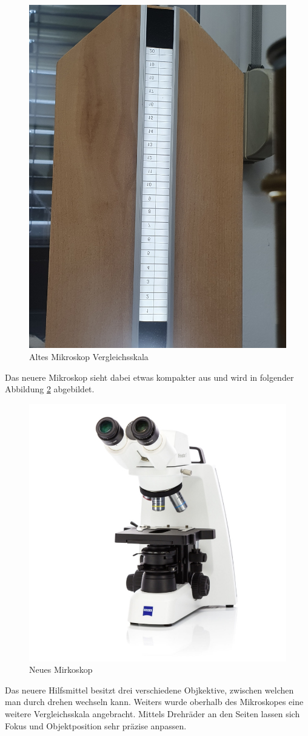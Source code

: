 \documentclass[12pt,a4paper,twoside]{article}
\begin{document}
    \begin{figure}[H]
        \centering
        \includegraphics[width=0.5\linewidth, angle=-90]{nudes/AltesMikroMessskala.jpg}
        \caption{Altes Mikroskop Vergleichsskala}
        \label{fig:Altes Mikroskop Skala}
    \end{figure}

    \noindent
    Das neuere Mikroskop sieht dabei etwas kompakter aus und wird in folgender Abbildung \ref{fig:Neues Mirkoskop} abgebildet.

    \begin{figure}[H]
        \centering
        \includegraphics[width=0.5\linewidth, angle=0]{nudes/neues_mikroskop.jpg}
        \caption{Neues Mirkoskop \cite{neues_mikr}}
        \label{fig:Neues Mirkoskop}
    \end{figure}

    \noindent
    Das neuere Hilfsmittel besitzt drei verschiedene Objkektive, zwischen welchen man durch drehen wechseln kann. Weiters wurde oberhalb des Mikroskopes eine weitere Vergleichsskala angebracht.
    Mittels Drehräder an den Seiten lassen sich Fokus und Objektposition sehr präzise anpassen. \newline
    
\end{document}
